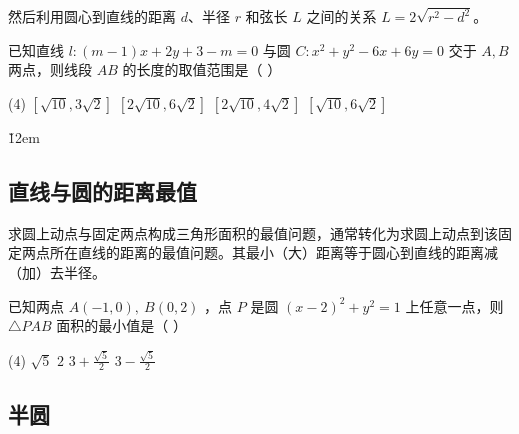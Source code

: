 \begin{theorem}[直线与圆的交点的弦长取值范围]
    然后利用圆心到直线的距离 $d$、半径 $r$ 和弦长 $L$ 之间的关系 $L=2\sqrt{r^2-d^2}$。
\end{theorem}

\begin{example}
    已知直线 $l:(m-1) x+2 y+3-m=0$ 与圆 $C: x^2+y^2-6 x+6 y=0$ 交于 $A, B$ 两点，则线段 $A B$ 的长度的取值范围是（ \hspace{2em} ）
    \begin{tasks}(4)
        \task $[\sqrt{10}, 3 \sqrt{2}]$
        \task $[2 \sqrt{10}, 6 \sqrt{2}]$
        \task $[2 \sqrt{10}, 4 \sqrt{2}]$
        \task $[\sqrt{10}, 6 \sqrt{2}]$
    \end{tasks}
\end{example}

\v{12em}

\subsection{直线与圆的距离最值}

\begin{theorem}[点到直线的距离与圆的几何性质]
    求圆上动点与固定两点构成三角形面积的最值问题，通常转化为求圆上动点到该固定两点所在直线的距离的最值问题。其最小（大）距离等于圆心到直线的距离减（加）去半径。
\end{theorem}

\begin{example}
    已知两点 $A(-1,0), ~ B(0,2)$ ，点 $P$ 是圆 $(x-2)^2+y^2=1$ 上任意一点，则 $\triangle P A B$ 面积的最小值是（ \hspace{2em} ）
    \begin{tasks}(4)
        \task $\sqrt{5}$
        \task $2$
        \task $3+\frac{\sqrt{5}}{2}$
        \task $3-\frac{\sqrt{5}}{2}$
    \end{tasks}
\end{example}

\vspace{10em}

\subsection{半圆}

